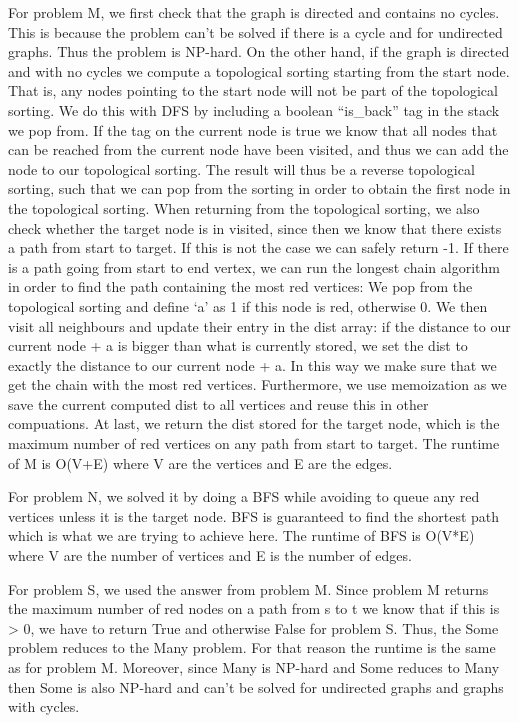 \documentclass{tufte-handout}
\begin{document}
For problem M, we first check that the graph is directed and contains no cycles. This is because the problem can’t be solved if there is a cycle and for undirected graphs. Thus the problem is NP-hard. On the other hand, if the graph is directed and with no cycles we compute a topological sorting starting from the start node. That is, any nodes pointing to the start node will not
 be part of the topological sorting. We do this with DFS by including a boolean “is\_back” tag in the stack we pop from. If the tag on the current node is true we know that all nodes that can be reached from the current node have been visited, and thus we can add the node to our topological sorting. The result will thus be a reverse topological sorting, 
such that we can pop from the sorting in order to obtain the first node in the topological sorting. When returning from the topological sorting, we also check whether the target node is in visited, since then we know that there exists a path from start to target. If this is not the case we can safely return
 -1. If there is a path going from start to end vertex, we can run the longest chain algorithm in order to find the path containing the most red vertices: We pop from the topological sorting and define ‘a’ as 1 if this node is red, otherwise 0. We then visit all neighbours and update their entry in the dist array: if the distance to our current node + a is bigger
 than what is currently stored, we set the dist to exactly the distance to our current node + a. In this way we make sure that we get the chain with the most red vertices. Furthermore, we use memoization as we save the current computed dist to all vertices and reuse this in other compuations. At last, we return the dist stored for the target node, which is the maximum number of red vertices on any path from start to target. The runtime of M is O(V+E) where V are the vertices and E are the edges.

For problem N, we solved it by doing a BFS while avoiding to queue any red vertices unless it is the target node. BFS is guaranteed
to find the shortest path which is what we are trying to achieve here.
The runtime of BFS is O(V*E) where V are the number of vertices and E is the number of edges.

For problem S, we used the answer from problem M. Since problem M returns the maximum number of red nodes on a path from s to t we know that if this is > 0, we have
to return True and otherwise False for problem S. Thus, the Some problem reduces to the Many problem.
For that reason the runtime is the same as for problem M. Moreover, since Many is NP-hard and Some reduces to Many then Some is also NP-hard and can't be solved for
undirected graphs and graphs with cycles.
\end{document}
